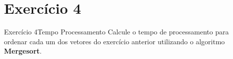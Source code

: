 \documentclass[aspectratio=169]{beamer}
\begin{document}
\section{Exercício 4}

\begin{frame}[fragile]{Exercício 4}{Tempo Processamento}
Calcule o tempo de processamento para ordenar cada um dos vetores do exercício anterior utilizando o algoritmo {\bf Mergesort}. 
\end{frame}



\begin{frame}[plain]
  \titlepage
\end{frame}
\end{document}
